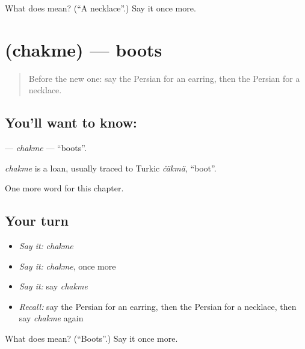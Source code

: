\begin{tcolorbox}[breakable,colback=teal!4,colframe=teal!35!black,title={Before you move on}]
What does  mean? (\textquotedblleft{}A necklace\textquotedblright{}.) Say it once more.
\end{tcolorbox}
\section[\texorpdfstring{\fa{چکمه} (chakme)}{چکمه (chakme)}]{ (chakme) — boots}

\label{lesson:FA-C97-chakme}



\begin{quote}
Before the new one: say the Persian for an earring, then the Persian for a necklace.
\end{quote}

\subsection*{You'll want to know: }
\textbf{} — \emph{chakme} — \textquotedblleft{}boots\textquotedblright{}.

\begin{cousinweb}
\emph{chakme} is a loan, usually traced to Turkic \emph{čäkmä}, \textquotedblleft{}boot\textquotedblright{}.
\end{cousinweb}

\begin{grammarlens}[title={What you've built}]
One more word for this chapter.
\end{grammarlens}

\subsection*{Your turn}
\begin{itemize}
\raggedright
  \item \emph{Say it:} \emph{chakme}
  \item \emph{Say it:} \emph{chakme}, once more
  \item \emph{Say it:} say \emph{chakme}
  \item \emph{Recall:} say the Persian for an earring, then the Persian for a necklace, then say \emph{chakme} again
\end{itemize}

\begin{tcolorbox}[breakable,colback=teal!4,colframe=teal!35!black,title={Before you move on}]
What does  mean? (\textquotedblleft{}Boots\textquotedblright{}.) Say it once more.
\end{tcolorbox}
